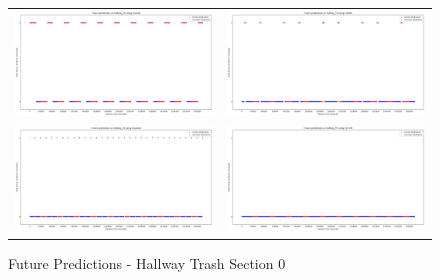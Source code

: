 \begin{figure}
  \begin{tabular}{cc}
    {\includegraphics[width = 3in]{images/results/Future_hallway_T0_Duckett.png}} &
    {\includegraphics[width = 3in]{images/results/Future_hallway_T0_FreMEn.png}} \\
    {\includegraphics[width = 3in]{images/results/Future_hallway_T0_Gaussian.png}} &
    {\includegraphics[width = 3in]{images/results/Future_hallway_T0_HyT-EM.png}} \\
  \end{tabular}
  \caption{Future Predictions - Hallway Trash Section 0}
\end{figure}

